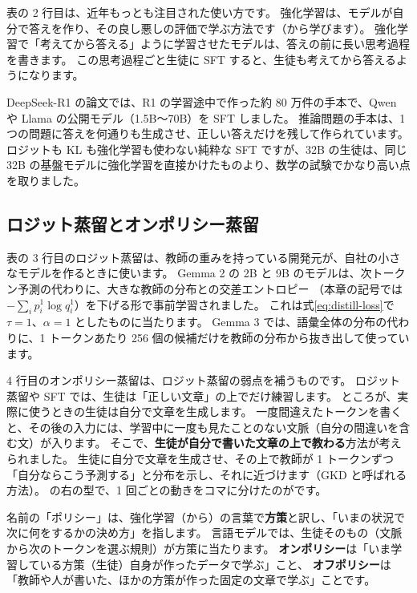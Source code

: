 表の 2 行目は、近年もっとも注目された使い方です。
強化学習は、モデルが自分で答えを作り、その良し悪しの評価で学ぶ方法です（から学びます）。
強化学習で「考えてから答える」ように学習させたモデルは、答えの前に長い思考過程を書きます。
この思考過程ごと生徒に SFT すると、生徒も考えてから答えるようになります。

DeepSeek-R1 の論文では、R1 の学習途中で作った約 80 万件の手本で、Qwen や Llama の公開モデル（1.5B〜70B）を SFT しました\cite{guo2025deepseekr1}。
推論問題の手本は、1 つの問題に答えを何通りも生成させ、正しい答えだけを残して作られています。
ロジットも KL も強化学習も使わない純粋な SFT ですが、32B の生徒は、同じ 32B の基盤モデルに強化学習を直接かけたものより、数学の試験でかなり高い点を取りました。

\subsection{ロジット蒸留とオンポリシー蒸留}

表の 3 行目のロジット蒸留は、教師の重みを持っている開発元が、自社の小さなモデルを作るときに使います。
Gemma 2 の 2B と 9B のモデルは、次トークン予測の代わりに、大きな教師の分布との交差エントロピー
（本章の記号では $-\sum_i p^1_i\log q^1_i$）を下げる形で事前学習されました\cite{gemma2024gemma2}。
これは式\eqref{eq:distill-loss}で $\tau=1$、$\alpha=1$ としたものに当たります。
Gemma 3 では、語彙全体の分布の代わりに、1 トークンあたり 256 個の候補だけを教師の分布から抜き出して使っています\cite{gemma2025gemma3}。

4 行目のオンポリシー蒸留は、ロジット蒸留の弱点を補うものです。
ロジット蒸留や SFT では、生徒は「正しい文章」の上でだけ練習します。
ところが、実際に使うときの生徒は自分で文章を生成します。
一度間違えたトークンを書くと、その後の入力には、学習中に一度も見たことのない文脈（自分の間違いを含む文）が入ります。
そこで、\textbf{生徒が自分で書いた文章の上で教わる}方法が考えられました。
生徒に自分で文章を生成させ、その上で教師が 1 トークンずつ「自分ならこう予測する」と分布を示し、それに近づけます（GKD と呼ばれる方法\cite{agarwal2024gkd}）。
の右の型で、1 回ごとの動きをコマに分けたのがです。

名前の「ポリシー」は、強化学習（から）の言葉で\textbf{方策}と訳し、「いまの状況で次に何をするかの決め方」を指します。
言語モデルでは、生徒そのもの（文脈から次のトークンを選ぶ規則）が方策に当たります。
\textbf{オンポリシー}は「いま学習している方策（生徒）自身が作ったデータで学ぶ」こと、
\textbf{オフポリシー}は「教師や人が書いた、ほかの方策が作った固定の文章で学ぶ」ことです。

